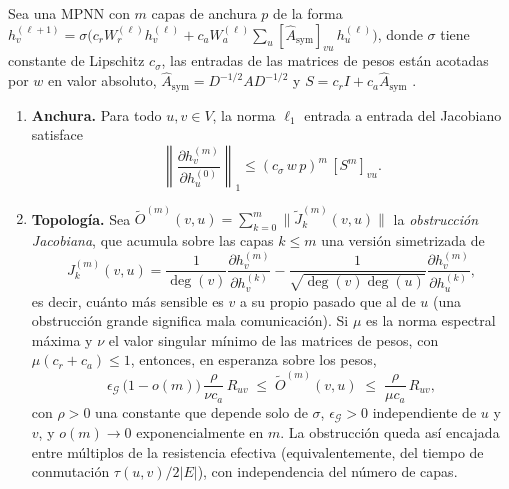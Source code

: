 \begin{theorem}\label{thm:oversquashing_resistencia}
	Sea una \gls{MPNN} con $m$ capas de anchura $p$ de la forma $h_v^{(\ell+1)} = \sigma\bigl(c_r W_r^{(\ell)} h_v^{(\ell)} + c_a W_a^{(\ell)} \sum_{u} [\hat{A}_{\mathrm{sym}}]_{vu}\, h_u^{(\ell)}\bigr)$, donde $\sigma$ tiene constante de Lipschitz $c_\sigma$, las entradas de las matrices de pesos están acotadas por $w$ en valor absoluto, $\hat{A}_{\mathrm{sym}} = D^{-1/2} A D^{-1/2}$ y $S = c_r I + c_a \hat{A}_{\mathrm{sym}}$ \citep{digiovanni2023oversquashing}.
	\begin{enumerate}
		\item \textbf{Anchura.} Para todo $u, v \in V$, la norma $\ell_1$ entrada a entrada del Jacobiano satisface
		\[
			\left\|\frac{\partial h_v^{(m)}}{\partial h_u^{(0)}}\right\|_1 \leq (c_\sigma\, w\, p)^m\, [S^m]_{vu}.
		\]
		\item \textbf{Topología.} Sea $\tilde{O}^{(m)}(v,u) = \sum_{k=0}^{m}\|\tilde{J}^{(m)}_k(v,u)\|$ la \textit{obstrucción Jacobiana}, que acumula sobre las capas $k \leq m$ una versión simetrizada de
		\[
			J^{(m)}_k(v,u) = \frac{1}{\deg(v)}\frac{\partial h_v^{(m)}}{\partial h_v^{(k)}} - \frac{1}{\sqrt{\deg(v)\deg(u)}}\frac{\partial h_v^{(m)}}{\partial h_u^{(k)}},
		\]
		es decir, cuánto más sensible es $v$ a su propio pasado que al de $u$ (una obstrucción grande significa mala comunicación). Si $\mu$ es la norma espectral máxima y $\nu$ el valor singular mínimo de las matrices de pesos, con $\mu(c_r + c_a) \leq 1$, entonces, en esperanza sobre los pesos,
		\[
			\epsilon_{\mathcal{G}}\,\bigl(1 - o(m)\bigr)\,\frac{\rho}{\nu c_a}\, R_{uv} \;\leq\; \tilde{O}^{(m)}(v,u) \;\leq\; \frac{\rho}{\mu c_a}\, R_{uv},
		\]
		con $\rho > 0$ una constante que depende solo de $\sigma$, $\epsilon_{\mathcal{G}} > 0$ independiente de $u$ y $v$, y $o(m) \to 0$ exponencialmente en $m$. La obstrucción queda así encajada entre múltiplos de la resistencia efectiva (equivalentemente, del tiempo de conmutación $\tau(u,v)/2|E|$), con independencia del número de capas.
	\end{enumerate}
\end{theorem}

